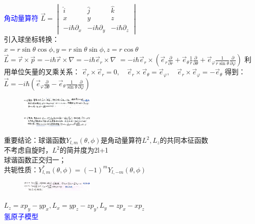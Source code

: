 \documentclass[a4paper,8pt]{extarticle} %
\newcommand{\bluetext}[1]{\textcolor{blue}{#1}}
\begin{document}
\begin{multicols}{3}
\bluetext{角动量算符}
$\vec{L} = \begin{vmatrix} \hat{i} & \hat{j} & \hat{k} \\ x & y & z \\ -i\hbar\partial_x & -i\hbar\partial_y & -i\hbar\partial_z \end{vmatrix}$\\
引入球坐标转换：\\$x = r\sin\theta\cos\phi, y = r\sin\theta\sin\phi, z = r\cos\theta$\\
$\vec{L} = \vec{r} \times \vec{p} = -i\hbar\vec{r} \times \nabla = -i\hbar\vec{e}_r \times \nabla$
$= -i\hbar\vec{e}_r \times (\vec{e}_r \frac{\partial}{\partial r} + \vec{e}_\theta \frac{1}{r}\frac{\partial}{\partial \theta} + \vec{e}_\varphi \frac{1}{r\sin\theta}\frac{\partial}{\partial \varphi})$
利用单位矢量的叉乘关系：
$\vec{e}_r \times \vec{e}_r = 0, \quad \vec{e}_r \times \vec{e}_\theta = \vec{e}_\varphi, \quad \vec{e}_r \times \vec{e}_\varphi = -\vec{e}_\theta$
得到：
$\vec{L} = -i\hbar(\vec{e}_\varphi \frac{\partial}{\partial \theta} - \vec{e}_\theta \frac{1}{\sin\theta}\frac{\partial}{\partial \varphi})$
\begin{figure}[H]
    \centering
    \includegraphics[width=0.32\textwidth]{images/6.png}
    \vspace{-0.6cm}
\end{figure}
\begin{figure}[H]
    \centering
    \includegraphics[width=0.32\textwidth]{images/7.png}
    \vspace{-0.6cm}
\end{figure}
重要结论：球谐函数$Y_{l,m}(\theta,\phi)$是角动量算符$L^2,L_z$的共同本征函数\\
不考虑自旋时，$L^2$的简并度为2l+1\\
球谐函数正交归一；\\
共轭性质：$Y_{l,m}^*(\theta,\phi) = (-1)^mY_{l,-m}(\theta,\phi)$\\
\begin{figure}[H]
    \vspace{-0.5cm}
    \centering
    \includegraphics[width=0.32\textwidth]{images/8.png}
    \vspace{-0.6cm}
\end{figure}
$L_z=xp_y-yp_x,L_x=yp_z-zp_y,L_y=zp_x-xp_z$\\
\bluetext{氢原子模型}


\end{multicols}
\end{document}

